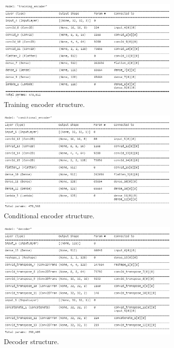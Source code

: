 \documentclass{l4proj}
\begin{document}
\begin{figure}[H]
    \centering
    \begin{subfigure}[b]{0.49\textwidth}
        \includegraphics[width=\textwidth]{images/TrainingEncoder.PNG}
        \caption{Training encoder structure.}
    \end{subfigure}
    \begin{subfigure}[b]{0.49\textwidth}
        \includegraphics[width=\textwidth]{images/ConditionalEncoder.PNG}
        \caption{Conditional encoder structure.}
    \end{subfigure} 
    \begin{subfigure}[b]{0.49\textwidth}
        \includegraphics[width=\textwidth]{images/Decoder.PNG}
        \caption{Decoder structure.}
    \end{subfigure} 
    \caption{}
    \label{fig:cvae_model}
\end{figure}
\end{document}
